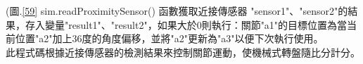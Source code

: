 (圖.\ref{59} sim.readProximitySensor() 函數獲取近接傳感器 "sensor1"、"sensor2"的結果，存入變量"result1"、"result2"，如果大於0則執行：關節"a1"的目標位置為當当前位置"a2"加上36度的角度偏移，並將"a2"更新為"a3"以便下次執行使用。\\
  此程式碼根據近接傳感器的檢測結果來控制關節運動，使機械式轉盤隨比分計分。\\
\renewcommand{\baselinestretch}{0} %